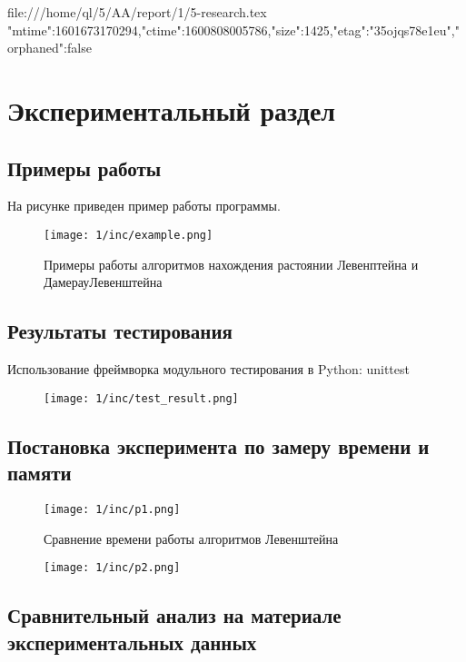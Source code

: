file:///home/ql/5/AA/report/1/5-research.tex {"mtime":1601673170294,"ctime":1600808005786,"size":1425,"etag":"35ojqs78e1eu","orphaned":false}
\chapter{Экспериментальный раздел}
\label{cha:research}

\section{Примеры работы}

На рисунке приведен пример работы программы.

\begin{figure}[h]
    \centering
    \texttt{[image: 1/inc/example.png]}
    \caption{Примеры работы алгоритмов нахождения растоянии Левенптейна и ДамерауЛевенштейна}
\end{figure}



\section{Результаты тестирования}

Использование фреймворка модульного тестирования в Python: unittest

\begin{figure}[h]
    \centering
    \texttt{[image: 1/inc/test\_result.png]}
\end{figure}



\pagebreak
\section{Постановка эксперимента по замеру времени и памяти}

\begin{figure}[ht]
    \centering
    \texttt{[image: 1/inc/p1.png]}
    \caption{Сравнение времени работы алгоритмов Левенштейна}
\end{figure}

\pagebreak
\begin{figure}[ht]
    \centering
    \texttt{[image: 1/inc/p2.png]}
\end{figure}


\section{Сравнительный анализ на материале экспериментальных данных}
